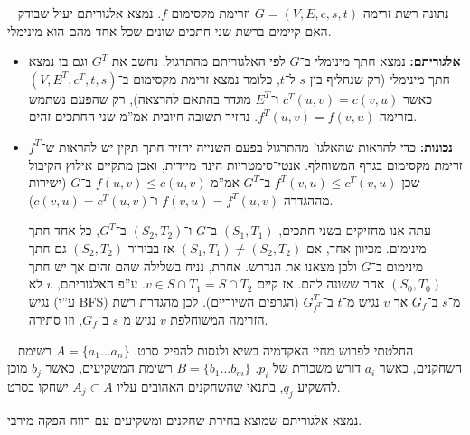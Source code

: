 \documentclass[]{article}
\begin{document}
	\newpage \ \newpage 
	נתונה רשת זרימה $G = (V, E, c, s, t)$ וזרימת מקסימום $f$. נמצא אלגוריתם יעיל שבודק האם קיימים ברשת שני חתכים שונים שכל אחד מהם הוא מינימלי. 
	\begin{itemize}
		\item \textbf{אלגוריתם: }נמצא חתך מינימלי ב־$G$ לפי האלגוריתם מהתרגול. נחשב את $G^{T}$
		 וגם בו נמצא חתך מינימלי (רק שנחליף בין $s$ ל־$t$, כלומר נמצא זרימת מקסימום ב־$(V, E^T, c^T, t, s)$ כאשר $c^T(u, v) = c(v, u)$ ו־$E^T$ מוגדר בהתאם להרצאה), רק שהפעם נשתמש בזרימה $f^{T}(u, v) = f(v, u)$. נחזיר תשובה חיובית אמ''מ שני החתכים זהים. 
		\item \textbf{נכונות: }כדי להראות שהאלגו' מהתרגול בפעם השנייה יחזיר חתך תקין יש להראות ש־$f^{T}$ זרימת מקסימום בגרף המשוחלף. אנטי־סימטריות הינה מיידית, ואכן מתקיים אילוץ הקיבול שכן $f^{T}(v, u) \le c^{T}(v, u)$ ב־$G^{T}$ אמ''מ $f(u, v) \le c(u, v)$ ב־$G$ (ישירות מההגדרה $f(v, u) = f^{T}(u, v)$ ו־$c(v, u) = c^{T}(u, v)$). 
		
		עתה אנו מחזיקים בשני חתכים, $(S_1, T_1)$ ב־$G$ ו־$(S_2, T_2)$ ב־$G^{T}$, כל אחד חתך מינימום. 
		מכיוון אחד, אם $(S_1, T_1) \neq (S_2, T_2)$ אז בבירור $(S_2, T_2)$ גם חתך מינימום ב־$G$ ולכן מצאנו את הנדרש. אחרת, נניח בשלילה שהם זהים אך יש חתך $(S_0, T_0)$ אחר ששונה להם. אז קיים $v \in S \cap T_1 = S \cap T_2$. ע''פ האלגוריתם, $v$ לא נגיש (ע''י BFS) מ־$s$ ב־$G_f$ אך $v$ נגיש מ־$t$ ב־$G^T_{f^T}$ (הגרפים השיוריים). לכן מהגדרת רשת הזרימה המשוחלפת $v$ נגיש מ־$s$ ב־$G_f$, וזו סתירה. 
	\end{itemize}
	
	\newpage \ \newpage 
	החלטתי לפרוש מחיי האקדמיה בשיא ולנסות להפיק סרט. $A = \{a_1 \dots a_n\}$ רשימת השחקנים, כאשר $a_i$ דורש משכורת של $p_i$. $B = \{b_1 \dots b_m\}$ רשימת המשקיעים, כאשר $b_j$ מוכן להשקיע $q_j$, בתנאי שהשחקנים האהובים עליו $A_j \subset A$ ישחקו בסרט. 
	
	נמצא אלגוריתם שמוצא בחירת שחקנים ומשקיעים עם רווח הפקה מירבי. 
	
\end{document}

